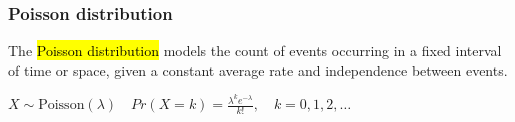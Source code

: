 \documentclass[slidestop,compress,mathserif]{beamer}
\makeatletter
\def\weekv@path{../../Week5}
\makeatother
\begin{document}
\begin{frame}
\frametitle{Poisson distribution}

The \hl{Poisson distribution} models the count of events occurring in a fixed interval of time or space, given a constant average rate and independence between events.

\begin{small}
$X \sim \text{Poisson}(\lambda) \quad
Pr(X=k) = \frac{\lambda^k e^{-\lambda}}{k!}, 
\quad k = 0, 1, 2, \ldots$
\end{small}

\end{frame}
\end{document}
